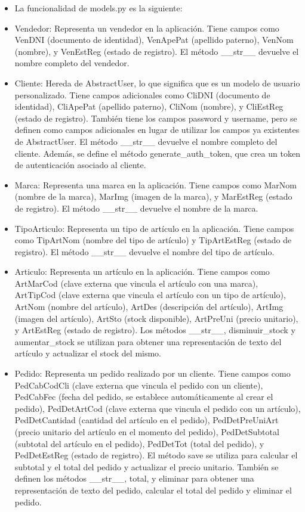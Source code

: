 \documentclass{article}
\begin{document}
    \begin{itemize}
        \item La funcionalidad de models.py es la siguiente:
        \item Vendedor: Representa un vendedor en la aplicación. Tiene campos como VenDNI (documento de identidad), VenApePat (apellido paterno), VenNom (nombre), y VenEstReg (estado de registro). El método \_\_str\_\_ devuelve el nombre completo del vendedor.
        \item Cliente: Hereda de AbstractUser, lo que significa que es un modelo de usuario personalizado. Tiene campos adicionales como CliDNI (documento de identidad), CliApePat (apellido paterno), CliNom (nombre), y CliEstReg (estado de registro). También tiene los campos password y username, pero se definen como campos adicionales en lugar de utilizar los campos ya existentes de AbstractUser. El método \_\_str\_\_ devuelve el nombre completo del cliente. Además, se define el método generate\_auth\_token, que crea un token de autenticación asociado al cliente.
        \item Marca: Representa una marca en la aplicación. Tiene campos como MarNom (nombre de la marca), MarImg (imagen de la marca), y MarEstReg (estado de registro). El método \_\_str\_\_ devuelve el nombre de la marca.
        \item TipoArticulo: Representa un tipo de artículo en la aplicación. Tiene campos como TipArtNom (nombre del tipo de artículo) y TipArtEstReg (estado de registro). El método \_\_str\_\_ devuelve el nombre del tipo de artículo.
        \item Articulo: Representa un artículo en la aplicación. Tiene campos como ArtMarCod (clave externa que vincula el artículo con una marca), ArtTipCod (clave externa que vincula el artículo con un tipo de artículo), ArtNom (nombre del artículo), ArtDes (descripción del artículo), ArtImg (imagen del artículo), ArtSto (stock disponible), ArtPreUni (precio unitario), y ArtEstReg (estado de registro). Los métodos \_\_str\_\_, disminuir\_stock y aumentar\_stock se utilizan para obtener una representación de texto del artículo y actualizar el stock del mismo.
        \item Pedido: Representa un pedido realizado por un cliente. Tiene campos como PedCabCodCli (clave externa que vincula el pedido con un cliente), PedCabFec (fecha del pedido, se establece automáticamente al crear el pedido), PedDetArtCod (clave externa que vincula el pedido con un artículo), PedDetCantidad (cantidad del artículo en el pedido), PedDetPreUniArt (precio unitario del artículo en el momento del pedido), PedDetSubtotal (subtotal del artículo en el pedido), PedDetTot (total del pedido), y PedDetEstReg (estado de registro). El método save se utiliza para calcular el subtotal y el total del pedido y actualizar el precio unitario. También se definen los métodos \_\_str\_\_, total, y eliminar para obtener una representación de texto del pedido, calcular el total del pedido y eliminar el pedido.

\end{itemize}
\end{document}
